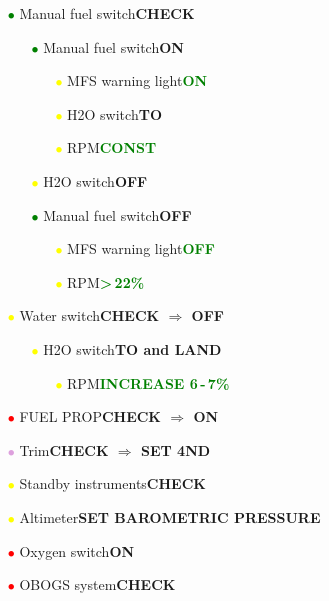 \documentclass[a4paper,12pt,dvipsnames]{letter}
\newcommand{\button}[1]{\textbf{#1}}
\newcommand{\Deg}{\textdegree{}}
\newcommand{\ok}[1]{\textcolor{Green}{\textbf{#1}}}
\newcommand{\ri}{\textcolor{Red}{$\bullet$\;}}
\newcommand{\gi}{\textcolor{Green}{$\bullet$\;}}
\newcommand{\yi}{\textcolor{Yellow}{$\bullet$\;}}
\newcommand{\vi}{\textcolor{Plum}{$\bullet$\;}}
\begin{document}
{\begin{itemize}
\begin{itemize}
\begin{itemize}
  \item[\yi] JPTL warning light\dotfill\ok{OFF}
 \end{itemize} 
\end{itemize}
\item[\gi] Manual fuel switch\dotfill\button{CHECK}
\begin{itemize}
 \item[\gi] Manual fuel switch\dotfill\button{ON}
 \begin{itemize}
  \item[\yi] MFS warning light\dotfill\ok{ON}
  \item[\yi] H2O switch\dotfill\button{TO}
  \item[\yi] RPM\dotfill\ok{CONST}
 \end{itemize}
 \item[\yi] H2O switch\dotfill\button{OFF}
 \item[\gi] Manual fuel switch\dotfill\button{OFF}
 \begin{itemize}
  \item[\yi] MFS warning light\dotfill\ok{OFF}
  \item[\yi] RPM\dotfill\ok{>\,22\%}
 \end{itemize}
\end{itemize}
\item[\yi] Water switch\dotfill\button{CHECK $\Rightarrow$ OFF}
\begin{itemize}
 \item[\yi] H2O switch\dotfill\button{TO and LAND}
 \begin{itemize}
 \item[\yi] RPM\dotfill\ok{INCREASE 6\,-\,7\%}
 \end{itemize}
\end{itemize}
\item[\ri] FUEL PROP\dotfill\button{CHECK $\Rightarrow$ ON}
\item[\vi] Trim\dotfill\button{CHECK $\Rightarrow$ SET 4\Deg\;ND}
\item[\yi] Standby instruments\dotfill\button{CHECK}
\item[\yi] Altimeter\dotfill\button{SET BAROMETRIC PRESSURE}
\item[\ri] Oxygen switch\dotfill\button{ON}
\item[\ri] OBOGS system\dotfill\button{CHECK}
\end{itemize}
}
\end{document}
